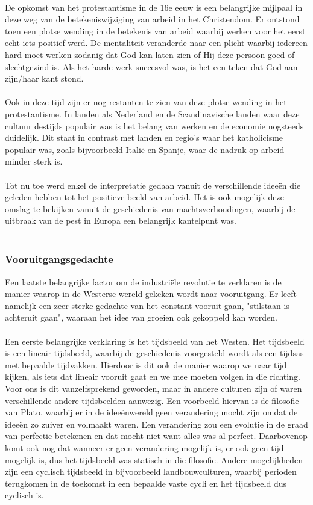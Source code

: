 \documentclass[../summary.tex]{subfiles}
\begin{document}
	\\
	De opkomst van het protestantisme in de 16e eeuw is een belangrijke mijlpaal in deze weg van de betekeniswijziging van arbeid in het Christendom. Er ontstond toen een plotse wending in de betekenis van arbeid waarbij werken voor het eerst echt iets positief werd. De mentaliteit veranderde naar een plicht waarbij iedereen hard moet werken zodanig dat God kan laten zien of Hij deze persoon goed of slechtgezind is. Als het harde werk  succesvol was, is het een teken dat God aan zijn/haar kant stond.\\
	\\
	Ook in deze tijd zijn er nog restanten te zien van deze plotse wending in het protestantisme. In landen als Nederland en de Scandinavische landen waar deze cultuur destijds populair was is het belang van werken en de economie nogsteeds duidelijk. Dit staat in contrast met landen en regio's waar het katholicisme populair was, zoals bijvoorbeeld Italië en Spanje, waar de nadruk op arbeid minder sterk is.\\
	\\
	Tot nu toe werd enkel de interpretatie gedaan vanuit de verschillende ideeën die geleden hebben tot het positieve beeld van arbeid. Het is ook mogelijk deze omslag te bekijken vanuit de geschiedenis van machtsverhoudingen, waarbij de uitbraak van de pest in Europa een belangrijk  kantelpunt was.\\
	\\
	\subsubsection{Vooruitgangsgedachte}
	Een laatste belangrijke factor om de industriële revolutie te verklaren is de manier waarop in de Westerse wereld gekeken wordt naar vooruitgang. Er leeft namelijk een zeer sterke gedachte van het constant vooruit gaan, "stilstaan is achteruit gaan", waaraan het idee van groeien ook gekoppeld kan worden.\\
	\\
	Een eerste belangrijke verklaring is het tijdsbeeld van het Westen. Het tijdsbeeld is een lineair tijdsbeeld, waarbij de geschiedenis voorgesteld wordt als een tijdsas met bepaalde tijdvakken. Hierdoor is dit ook de manier waarop we naar tijd kijken, als iets dat lineair vooruit gaat en we mee moeten volgen in die richting. Voor ons is dit vanzelfsprekend geworden, maar in andere culturen zijn of waren verschillende andere tijdsbeelden aanwezig. Een voorbeeld hiervan is de filosofie van Plato, waarbij er in de ideeënwereld geen verandering mocht zijn omdat de ideeën zo zuiver en volmaakt waren. Een verandering zou een evolutie in de graad van perfectie betekenen en dat mocht niet want alles was al perfect. Daarbovenop komt ook nog dat wanneer er geen verandering mogelijk is, er ook geen tijd mogelijk is, dus het tijdsbeeld was statisch in die filosofie. Andere mogelijkheden zijn een cyclisch tijdsbeeld in bijvoorbeeld landbouwculturen, waarbij perioden terugkomen in de toekomst in een bepaalde vaste cycli en het tijdsbeeld dus cyclisch is.\\
	\\
	
	
\end{document}
